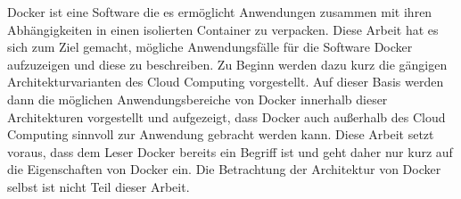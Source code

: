 \label{sec:zusammenfassung}
Docker ist eine Software die es ermöglicht Anwendungen zusammen mit ihren Abhängigkeiten in einen isolierten Container zu verpacken.
Diese Arbeit hat es sich zum Ziel gemacht, mögliche Anwendungsfälle für die Software Docker aufzuzeigen und diese zu beschreiben.
Zu Beginn werden dazu kurz die gängigen Architekturvarianten des Cloud Computing vorgestellt.
Auf dieser Basis werden dann die möglichen Anwendungsbereiche von Docker innerhalb dieser Architekturen vorgestellt und aufgezeigt, dass Docker auch außerhalb des Cloud Computing sinnvoll zur Anwendung gebracht werden kann.
Diese Arbeit setzt voraus, dass dem Leser Docker bereits ein Begriff ist und geht daher nur kurz auf 
die Eigenschaften von Docker ein. Die Betrachtung der Architektur von Docker selbst ist nicht Teil dieser Arbeit.

